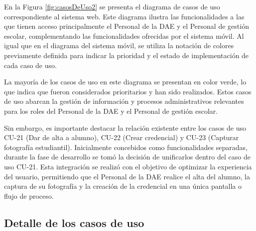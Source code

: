 En la Figura \ref{fig:casosDeUso2} se presenta el diagrama de casos de uso correspondiente al sistema web. Este diagrama ilustra las funcionalidades a las que tienen acceso principalmente el Personal de la DAE y el Personal de gestión escolar, complementando las funcionalidades ofrecidas por el sistema móvil. Al igual que en el diagrama del sistema móvil, se utiliza la notación de colores previamente definida para indicar la prioridad y el estado de implementación de cada caso de uso.

La mayoría de los casos de uso en este diagrama se presentan en color verde, lo que indica que fueron considerados prioritarios y han sido realizados. Estos casos de uso abarcan la gestión de información y procesos administrativos relevantes para los roles del Personal de la DAE y el Personal de gestión escolar.

Sin embargo, es importante destacar la relación existente entre los casos de uso CU-21 (Dar de alta a alumno), CU-22 (Crear credencial) y CU-23 (Capturar fotografía estudiantil). Inicialmente concebidos como funcionalidades separadas, durante la fase de desarrollo se tomó la decisión de unificarlos dentro del caso de uso CU-21. Esta integración se realizó con el objetivo de optimizar la experiencia del usuario, permitiendo que el Personal de la DAE realice el alta del alumno, la captura de su fotografía y la creación de la credencial en una única pantalla o flujo de proceso. 

\subsection{Detalle de los casos de uso}



\newpage


\newpage


\newpage


\newpage


\newpage


\newpage


\newpage


\newpage


\newpage


\newpage


\newpage

